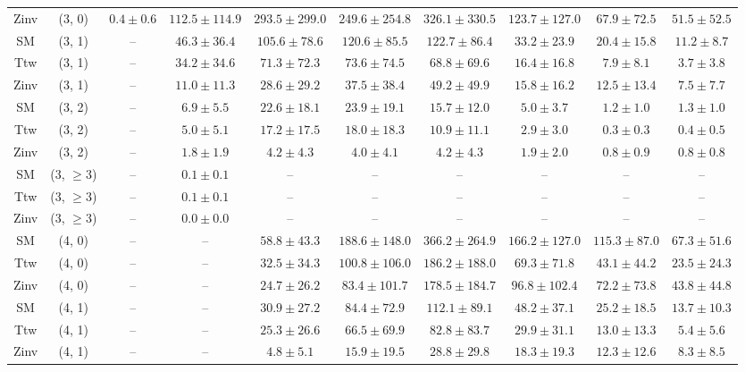 \begin{table}[h!]
{\begin{tabular}{cccccccccc}
	Zinv & (3, 0) & $0.4\pm 0.6$ & $112.5\pm 114.9$ & $293.5\pm 299.0$ & $249.6\pm 254.8$ & $326.1\pm 330.5$ & $123.7\pm 127.0$ & $67.9\pm 72.5$ & $51.5\pm 52.5$ \\[0.5ex] 
	SM & (3, 1) & -- & $46.3\pm 36.4$ & $105.6\pm 78.6$ & $120.6\pm 85.5$ & $122.7\pm 86.4$ & $33.2\pm 23.9$ & $20.4\pm 15.8$ & $11.2\pm 8.7$ \\[0.5ex] 
	Ttw & (3, 1) & -- & $34.2\pm 34.6$ & $71.3\pm 72.3$ & $73.6\pm 74.5$ & $68.8\pm 69.6$ & $16.4\pm 16.8$ & $7.9\pm 8.1$ & $3.7\pm 3.8$ \\[0.5ex] 
	Zinv & (3, 1) & -- & $11.0\pm 11.3$ & $28.6\pm 29.2$ & $37.5\pm 38.4$ & $49.2\pm 49.9$ & $15.8\pm 16.2$ & $12.5\pm 13.4$ & $7.5\pm 7.7$ \\[0.5ex] 
	SM & (3, 2) & -- & $6.9\pm 5.5$ & $22.6\pm 18.1$ & $23.9\pm 19.1$ & $15.7\pm 12.0$ & $5.0\pm 3.7$ & $1.2\pm 1.0$ & $1.3\pm 1.0$ \\[0.5ex] 
	Ttw & (3, 2) & -- & $5.0\pm 5.1$ & $17.2\pm 17.5$ & $18.0\pm 18.3$ & $10.9\pm 11.1$ & $2.9\pm 3.0$ & $0.3\pm 0.3$ & $0.4\pm 0.5$ \\[0.5ex] 
	Zinv & (3, 2) & -- & $1.8\pm 1.9$ & $4.2\pm 4.3$ & $4.0\pm 4.1$ & $4.2\pm 4.3$ & $1.9\pm 2.0$ & $0.8\pm 0.9$ & $0.8\pm 0.8$ \\[0.5ex] 
	SM & (3, $\ge3$) & -- & $0.1\pm 0.1$ & -- & -- & -- & -- & -- & -- \\[0.5ex] 
	Ttw & (3, $\ge3$) & -- & $0.1\pm 0.1$ & -- & -- & -- & -- & -- & -- \\[0.5ex] 
	Zinv & (3, $\ge3$) & -- & $0.0\pm 0.0$ & -- & -- & -- & -- & -- & -- \\[0.5ex] 
	SM & (4, 0) & -- & -- & $58.8\pm 43.3$ & $188.6\pm 148.0$ & $366.2\pm 264.9$ & $166.2\pm 127.0$ & $115.3\pm 87.0$ & $67.3\pm 51.6$ \\[0.5ex] 
	Ttw & (4, 0) & -- & -- & $32.5\pm 34.3$ & $100.8\pm 106.0$ & $186.2\pm 188.0$ & $69.3\pm 71.8$ & $43.1\pm 44.2$ & $23.5\pm 24.3$ \\[0.5ex] 
	Zinv & (4, 0) & -- & -- & $24.7\pm 26.2$ & $83.4\pm 101.7$ & $178.5\pm 184.7$ & $96.8\pm 102.4$ & $72.2\pm 73.8$ & $43.8\pm 44.8$ \\[0.5ex] 
	SM & (4, 1) & -- & -- & $30.9\pm 27.2$ & $84.4\pm 72.9$ & $112.1\pm 89.1$ & $48.2\pm 37.1$ & $25.2\pm 18.5$ & $13.7\pm 10.3$ \\[0.5ex] 
	Ttw & (4, 1) & -- & -- & $25.3\pm 26.6$ & $66.5\pm 69.9$ & $82.8\pm 83.7$ & $29.9\pm 31.1$ & $13.0\pm 13.3$ & $5.4\pm 5.6$ \\[0.5ex] 
	Zinv & (4, 1) & -- & -- & $4.8\pm 5.1$ & $15.9\pm 19.5$ & $28.8\pm 29.8$ & $18.3\pm 19.3$ & $12.3\pm 12.6$ & $8.3\pm 8.5$ \\[0.5ex] 

\end{tabular}}
\end{table}
